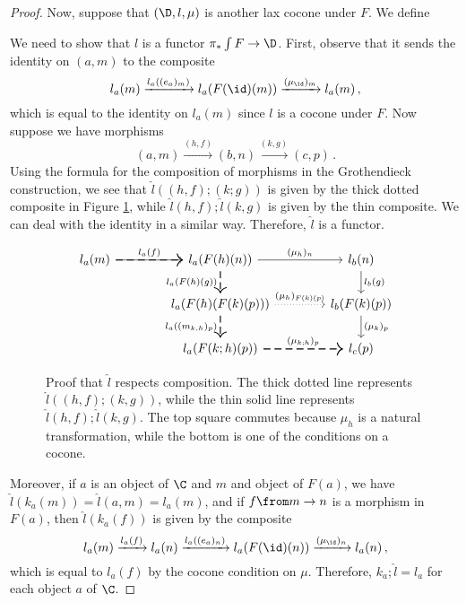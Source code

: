 \begin{proof}
  Now, suppose that $(\D,l,\mu)$ is another lax cocone under $F$.  
  We define
  We need to show that $\hat{l}$ is a functor $\pi_*\int F \to \D$.
  First, observe that it sends the identity on $(a,m)$ to the composite
  \[
    l_a(m) \xrightarrow{l_a((e_a)_m)}
    l_a(F(\id)(m)) \xrightarrow{(\mu_{\id})_m}
    l_a(m)\,,
    \]
  which is equal to the identity on $l_a(m)$ since $l$ is a cocone under $F$.
  Now suppose we have morphisms
  \[
    (a,m) \xrightarrow{(h,f)}
    (b,n) \xrightarrow{(k,g)}
    (c,p)\,.
    \]
  Using the formula for the composition of morphisms in the Grothendieck construction, we see that $\hat{l}((h,f);(k;g))$ is given by the thick dotted composite in Figure \ref{FigLHatFunctor}, while $\hat{l}(h,f);\hat{l}(k,g)$ is given by the thin composite.  
  We can deal with the identity in a similar way.
  Therefore, $\hat{l}$ is a functor.  
  \begin{figure}
    \[
      \begin{tikzcd}[column sep=40pt]
        l_a(m) \arrow[r, "l_a(f)"] \arrow[r, thick, dashed]
          & l_a(F(h)(n)) \arrow[r, "(\mu_h)_n"] \arrow[d, "l_a(F(h)(g))"', thick, dashed]
            & l_b(n) \arrow[d, "l_b(g)"] \\
          & l_a(F(h)(F(k)(p))) \arrow[r, "(\mu_h)_{F(k)(p)}", dotted] \arrow[d, "l_a((m_{k,h})_p)"', thick, dashed]
            & l_b(F(k)(p)) \arrow[d, "(\mu_k)_p"] \\
          & l_a(F(k;h)(p)) \arrow[r, "(\mu_{k;h})_p", thick, dashed]
            & l_c(p)
      \end{tikzcd}
      \]
    \caption[Proof that $\hat{l}$ respects composition.]
    {Proof that $\hat{l}$ respects composition.  
    The thick dotted line represents $\hat{l}((h,f);(k,g))$, while the thin solid line represents $\hat{l}(h,f);\hat{l}(k,g)$.  
    The top square commutes because $\mu_h$ is a natural transformation, while the bottom is one of the conditions on a cocone.}
    \label{FigLHatFunctor}
  \end{figure}

  Moreover, if $a$ is an object of $\C$ and $m$ and object of $F(a)$, we have $\hat{l}(k_a(m))=\hat{l}(a,m)=l_a(m)$, and if $f\from m \to n$ is a morphism in $F(a)$, then $\hat{l}(k_a(f))$ is given by the composite
  \[
    l_a(m) \xrightarrow{l_a(f)}
    l_a(n) \xrightarrow{l_a((e_a)_n)}
    l_a(F(\id)(n)) \xrightarrow{(\mu_{\id})_n}
    l_a(n)\,,
    \]
  which is equal to $l_a(f)$ by the cocone condition on $\mu$.
  Therefore, $k_a;\hat{l}=l_a$ for each object $a$ of $\C$.


\end{proof}

